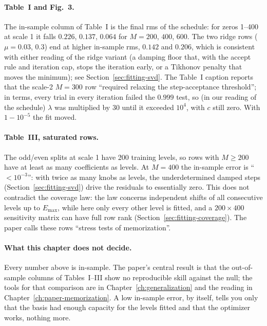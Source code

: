 \paragraph{Table~I and Fig.~3.} The in-sample column of Table~I is the final rms of the schedule: for zeros 1--400 at scale 1 it falls $0.226$, $0.137$, $0.064$ for $M=200$, $400$, $600$. The two ridge rows ($\mu=0.03$, $0.3$) end at higher in-sample rms, $0.142$ and $0.206$, which is consistent with either reading of the ridge variant (a damping floor that, with the accept rule and iteration cap, stops the iteration early, or a Tikhonov penalty that moves the minimum); see Section~\ref{sec:fitting-svd}. The Table~I caption reports that the scale-2 $M=300$ row ``required relaxing the step-acceptance threshold''; in  terms, every trial in every iteration failed the $0.999$ test, so (in our reading of the schedule) $\lambda$ was multiplied by 30 until it exceeded $10^4$, with $c$ still zero. With $1-10^{-5}$ the fit moved.

\paragraph{Table~III, saturated rows.} The odd/even splits at scale 1 have 200 training levels, so rows with $M\ge200$ have at least as many coefficients as levels. At $M=400$ the in-sample error is ``$<10^{-3}$'': with twice as many knobs as levels, the underdetermined damped steps (Section~\ref{sec:fitting-svd}) drive the residuals to essentially zero. This does not contradict the coverage law: the law concerns independent shifts of all consecutive levels up to $E_{\max}$, while here only every other level is fitted, and a $200\times400$ sensitivity matrix can have full row rank (Section~\ref{sec:fitting-coverage}). The paper calls these rows ``stress tests of memorization''.

\paragraph{What this chapter does not decide.} Every number above is in-sample. The paper's central result is that the out-of-sample columns of Tables~I--III show no reproducible skill against the null; the tools for that comparison are in Chapter~\ref{ch:generalization} and the reading in Chapter~\ref{ch:paper-memorization}. A low in-sample error, by itself, tells you only that the basis had enough capacity for the levels fitted and that the optimizer works, nothing more.

